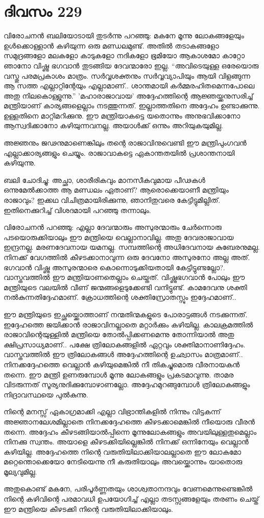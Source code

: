 \section{ദിവസം 229}


വിരോചനൻ ബലിയോടായി തുടർന്നു പറഞ്ഞു: മകനേ മൂന്നു ലോകങ്ങളേയും ഉൾക്കൊള്ളാൻ കഴിയുന്ന ഒരു മണ്ഡലമുണ്ട്. അതിൽ തടാകങ്ങളോ സമുദ്രങ്ങളോ മലകളോ കാടുകളോ നദികളോ ഭൂമിയോ ആകാശമോ കാറ്റോ ഞാനോ വിഷ്ണു ഭഗവാൻ തുടങ്ങിയ ദേവന്മാരോ ഇല്ല. “അവിടെയുള്ള ഒരേയൊരു വസ്തു പരമപ്രകാശം മാത്രം. സർവ്വശക്തനും സർവ്വവ്യാപിയും ആയി വിളങ്ങുന്ന ആ സത്ത എല്ലാറ്റിന്റേയും എല്ലാമാണ്‌.. ശാന്തമായി കർമ്മരഹിതമെന്നപോലെ അതു നിലകൊള്ളുന്നു.” 'മഹാരാജാവായ' അദ്ദേഹത്തിന്റെ ആജ്ഞയ്ക്കനുസരിച്ച് മന്ത്രിയാണ്‌ കാര്യങ്ങളെല്ലാം നടത്തുന്നത്. ഇല്ലാത്തതിനെ അദ്ദേഹം ഉണ്ടാക്കുന്നു. ഉള്ളതിനെ മാറ്റിമറിക്കുനു. ഈ മന്ത്രിയാകട്ടെ യതൊന്നും അനുഭവിക്കാനോ ആസ്വദിക്കാനോ കഴിയുന്നവനല്ല. അയാൾക്ക് ഒന്നും അറിയുകയുമില്ല.

അജ്ഞനും ജഢനുമാണെങ്കിലും തന്റെ രാജാവിനുവെണ്ടി ഈ മന്ത്രിപുംഗവൻ എല്ലാക്കാര്യങ്ങളും ചെയ്യും. രാജാവാകട്ടെ ഏകാന്തതയിൽ പ്രശാന്തനായി കഴിയുന്നു.

ബലി ചോദിച്ചു: അച്ഛാ, ശാരീരികവും മാനസീകവുമായ പീഢകൾ ഒന്നുമേൽക്കാത്ത ആ മണ്ഡലം ഏതാണ്‌? ആരൊക്കെയാണീ മന്ത്രിയും രാജാവും? ഇക്കഥ വിചിത്രമായിരിക്കുന്നു, ഞാനിതുവരെ കേട്ടിട്ടുമില്ലിത്. ഇതിനെക്കുറിച്ച് വിശദമായി പറഞ്ഞു തന്നാലും.

വിരോചനൻ പറഞ്ഞു: എല്ലാ ദേവന്മാരും അസുരന്മാരും ചേർന്നൊരു പടയൊരുക്കിയാലും ഈ മന്ത്രിയെ വെല്ലാനാവില്ല. അതു ദേവരാജാവായ ഇന്ദ്രനല്ല. മരണദേവനായ യമനല്ല. സമ്പത്തിന്റെ അധിദേവനായ കുബേരനുമല്ല. നിനക്ക് വേഗത്തിൽ കീഴടക്കാനാവുന്ന ഒരു ദേവനോ അസുരനോ അല്ല അത്. ഭഗവാൻ വിഷ്ണു അസുരന്മാരെ കൊന്നൊടുക്കിയതായി കേട്ടിട്ടുണ്ടല്ലോ?. വാസ്തവത്തിൽ ഈ മന്ത്രിയാണതെല്ലാം ചെയ്തത്. വിഷ്ണുഭഗവാൻ പോലും ഈ മന്ത്രിയുടെ വലയിൽ വീണ്‌ ജന്മങ്ങളെടുക്കേണ്ടി വനിട്ടുണ്ട്. കാമദേവനു ശക്തി നല്‍കുന്നതിദ്ദേഹമാണ്‌. ക്രോധത്തിന്റെ ശക്തിസ്രോതസ്സും ഇദ്ദേഹമാണ്‌..

ഈ മന്ത്രിയുടെ ഇച്ഛയ്ക്കൊത്താണ്‌ നന്മതിന്മകളുടെ പോരാട്ടങ്ങൾ നടക്കുന്നത്. ഇദ്ദേഹത്തെ ജയിക്കാൻ രാജാവിനല്ലാതെ മറ്റാർക്കും കഴിയില്ല. കാലക്രമത്തിൽ രാജാവിന്റെയുള്ളിൽ മന്ത്രിയെ തോല്‍പ്പിക്കണമെന്നു തോന്നിയാൽ അതു ക്ഷിപ്രസാധ്യമാണ്‌.. പക്ഷേ ത്രിലോകങ്ങളിൽ ഏറ്റവും ശക്തിമാനാണിദ്ദേഹം. വാസ്തവത്തിൽ ഈ ത്രിലോകങ്ങൾ അദ്ദേഹത്തിന്റെ ഉഛ്വാസം മാത്രമാണ്‌.. നിനക്കദ്ദേഹത്തെ വെല്ലാൻ കഴിയുമെങ്കിൽ നീ തികച്ചുമൊരു വീരനായകൻ തന്നെ. ഈ മന്ത്രി ഉണരുമ്പോൾ മൂന്നു ലോകങ്ങളും പ്രകടമാവുന്നു. താമര വിടരുന്നത് സൂര്യനുദിക്കുമ്പോഴാണല്ലോ. അദ്ദേഹമുറങ്ങുമ്പോൾ ത്രിലോകങ്ങളും നിദ്രാവസ്ഥയെ പുൽകുന്നു.

നിന്റെ മനസ്സ് ഏകാഗ്രമാക്കി എല്ലാ വിഭ്രാന്തികളിൽ നിന്നും വിട്ടകന്ന് അജ്ഞാനലേശമില്ലാതെ നിനക്കദ്ദേഹത്തെ കീഴടക്കാമെങ്കിൽ നീയൊരു വീരൻ തന്നെ. അദ്ദേഹം കീഴടങ്ങിയാൽപ്പിന്നെ മൂന്നുലോകങ്ങളും അവയിലുള്ളതുമെല്ലാം നിനക്കു സ്വന്തം. അയാളെ കീഴടക്കിയില്ലെങ്കിൽ നിനക്ക് ഒന്നിനേയും വെല്ലാൻ കഴിയില്ല. അദ്ദേഹത്തെ നിന്റെ വരുതിയിലാക്കിയാലല്ലാതെ ഈ ലോകമോ മറ്റെന്തൊക്കെയോ  നേടിയെന്നു നീ കരുതിയാലും അവയ്ക്കൊന്നും യാതൊരു മൂല്യവുമില്ല.

അതുകൊണ്ട് മകനേ, പരിപൂർണ്ണതയും ശാശ്വതാനന്ദവും വേണമെന്നുണ്ടെങ്കിൽ നിന്റെ കഴിവിന്റെ പരമാവധി ഉപയോഗിച്ച് എല്ലാ തടസ്സങ്ങളേയും തരണം ചെയ്ത് ഈ മന്ത്രിയെ കീഴടക്കി നിന്റെ വരുതിയിലാക്കിയാലും.
